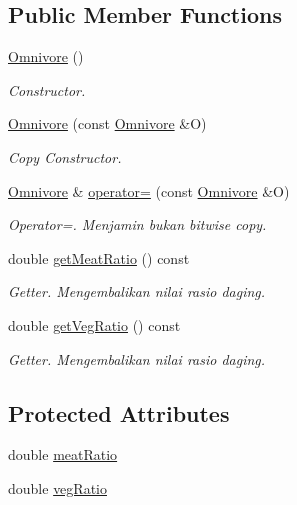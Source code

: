 \subsection*{Public Member Functions}
\begin{DoxyCompactItemize}
\item 
\hyperlink{classOmnivore_a4d11eb6aea5f74136b57ff122a3fce0f}{Omnivore} ()
\begin{DoxyCompactList}\small\item\em Constructor. \end{DoxyCompactList}\item 
\hyperlink{classOmnivore_acd127c58d1aeedcd355c6ea2f03428ba}{Omnivore} (const \hyperlink{classOmnivore}{Omnivore} \&O)
\begin{DoxyCompactList}\small\item\em Copy Constructor. \end{DoxyCompactList}\item 
\hyperlink{classOmnivore}{Omnivore} \& \hyperlink{classOmnivore_aac0b24e0ecddef1e3d2954a0d954c3a0}{operator=} (const \hyperlink{classOmnivore}{Omnivore} \&O)
\begin{DoxyCompactList}\small\item\em Operator=. Menjamin bukan bitwise copy. \end{DoxyCompactList}\item 
double \hyperlink{classOmnivore_adc5aa8eaf531a03278108d70b980e3d6}{get\+Meat\+Ratio} () const 
\begin{DoxyCompactList}\small\item\em Getter. Mengembalikan nilai rasio daging. \end{DoxyCompactList}\item 
double \hyperlink{classOmnivore_a4dbf38a7e0b9bc5357ab18643be79282}{get\+Veg\+Ratio} () const 
\begin{DoxyCompactList}\small\item\em Getter. Mengembalikan nilai rasio daging. \end{DoxyCompactList}\end{DoxyCompactItemize}
\subsection*{Protected Attributes}
\begin{DoxyCompactItemize}
\item 
double \hyperlink{classOmnivore_a41e3629de95c2055f5719d11b6af960d}{meat\+Ratio}
\item 
double \hyperlink{classOmnivore_af6acd414d9a4736ab647c72ccc9c1c87}{veg\+Ratio}
\end{DoxyCompactItemize}


